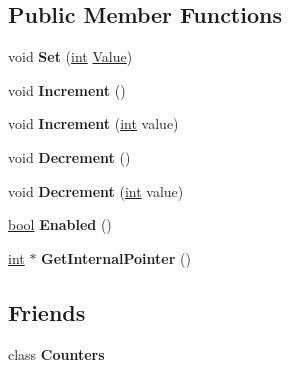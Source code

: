 \subsection*{Public Member Functions}
\begin{DoxyCompactItemize}
\item 
\mbox{\label{classv8_1_1internal_1_1StatsCounterThreadSafe_a5e75c64525412415326946ad39ec9c26}} 
void {\bfseries Set} (\mbox{\hyperlink{classint}{int}} \mbox{\hyperlink{classv8_1_1Value}{Value}})
\item 
\mbox{\label{classv8_1_1internal_1_1StatsCounterThreadSafe_aebaf779ef40c2df8f6d80c6ec91bcafd}} 
void {\bfseries Increment} ()
\item 
\mbox{\label{classv8_1_1internal_1_1StatsCounterThreadSafe_a7fa2d104dca6915bb9ead788d752e4de}} 
void {\bfseries Increment} (\mbox{\hyperlink{classint}{int}} value)
\item 
\mbox{\label{classv8_1_1internal_1_1StatsCounterThreadSafe_a168d89106429c2a01dfe5d73b5644324}} 
void {\bfseries Decrement} ()
\item 
\mbox{\label{classv8_1_1internal_1_1StatsCounterThreadSafe_a364dd1939c6c1d8e2a8bd024ff855180}} 
void {\bfseries Decrement} (\mbox{\hyperlink{classint}{int}} value)
\item 
\mbox{\label{classv8_1_1internal_1_1StatsCounterThreadSafe_a2db429022dc5e980cdcc2e14f8abf089}} 
\mbox{\hyperlink{classbool}{bool}} {\bfseries Enabled} ()
\item 
\mbox{\label{classv8_1_1internal_1_1StatsCounterThreadSafe_aa9b2cc4431f1b1fa20bb5236f45c3593}} 
\mbox{\hyperlink{classint}{int}} $\ast$ {\bfseries Get\+Internal\+Pointer} ()
\end{DoxyCompactItemize}
\subsection*{Friends}
\begin{DoxyCompactItemize}
\item 
\mbox{\label{classv8_1_1internal_1_1StatsCounterThreadSafe_a5545327f141103b96b160ddc48274bc0}} 
class {\bfseries Counters}
\end{DoxyCompactItemize}
